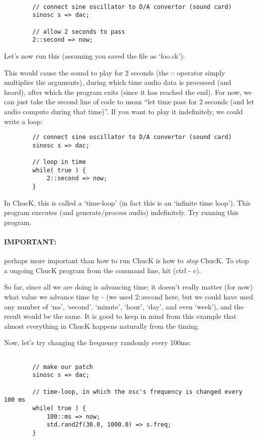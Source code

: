 \begin{verbatim}

        // connect sine oscillator to D/A convertor (sound card)
        sinosc s => dac;

        // allow 2 seconds to pass
        2::second => now;
\end{verbatim}

Let's now run this (assuming you saved the file as `foo.ck'):


This would cause the sound to play for 2 seconds (the :: operator simply multiplies the arguments), during which time audio data is processed (and heard), after which the program exits (since it has reached the end). For now, we can just take the second line of code to mean ``let time pass for 2 seconds (and let audio compute during that time)''. If you want to play it indefinitely, we could write a loop:

\begin{verbatim}
        // connect sine oscillator to D/A convertor (sound card)
        sinosc s => dac;

        // loop in time
        while( true ) {
            2::second => now;
        }
\end{verbatim}

In ChucK, this is called a `time-loop' (in fact this is an `infinite time loop'). This program executes (and generate/process audio) indefinitely. Try running this program. 

\paragraph*{IMPORTANT:} perhaps more important than how to run ChucK is how to \textit{stop} ChucK.  To stop a ongoing ChucK program from the command line, hit (ctrl - c).

So far, since all we are doing is advancing time; it doesn't really matter (for now) what value we advance time by - (we used 2::second here, but we could have used any number of `ms', `second', `minute', `hour', `day', and even `week'), and the result would be the same. It is good to keep in mind from this example that almost everything in ChucK happens naturally from the timing. 

Now, let's try changing the frequency randomly every 100ms:
\begin{verbatim}

        // make our patch
        sinosc s => dac;

        // time-loop, in which the osc's frequency is changed every 100 ms
        while( true ) {
            100::ms => now;
            std.rand2f(30.0, 1000.0) => s.freq;
        }
\end{verbatim}

